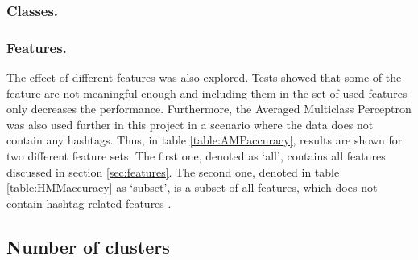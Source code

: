 \subsubsection*{Classes.} 


\subsubsection*{Features.}


The effect of different features was also explored. Tests showed that some of the feature are not meaningful enough and including them in the set of used features only decreases the performance. Furthermore, the Averaged Multiclass Perceptron was also used further in this project in a scenario where the data does not contain any hashtags. Thus, in table \ref{table:AMPaccuracy}, results are shown for two different feature sets. The first one, denoted as `all', contains all features discussed in section \ref{sec:features}.
The second one, denoted in table \ref{table:HMMaccuracy} as `subset', is a subset of all features, which does not contain hashtag-related features .

\subsection*{Number of clusters}
